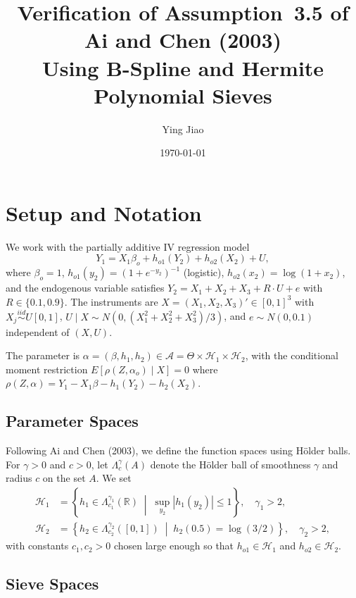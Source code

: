 \documentclass[12pt]{article}
\title{Verification of Assumption~3.5 of Ai and Chen (2003)\\[4pt]
\large Using B-Spline and Hermite Polynomial Sieves}
\author{Ying Jiao}
\date{\today}
\begin{document}
\maketitle

\section{Setup and Notation}

We work with the partially additive IV regression model
\begin{equation}\label{eq:structural}
Y_1 = X_1 \beta_o + h_{o1}(Y_2) + h_{o2}(X_2) + U,
\end{equation}
where $\beta_o = 1$, $h_{o1}(y_2) = (1+e^{-y_2})^{-1}$ (logistic), $h_{o2}(x_2) = \log(1+x_2)$, and the endogenous variable satisfies $Y_2 = X_1 + X_2 + X_3 + R \cdot U + e$ with $R \in \{0.1, 0.9\}$. The instruments are $X = (X_1, X_2, X_3)' \in [0,1]^3$ with $X_j \overset{iid}{\sim} U[0,1]$, $U \mid X \sim N(0, (X_1^2+X_2^2+X_3^2)/3)$, and $e \sim N(0, 0.1)$ independent of $(X, U)$.

The parameter is $\alpha = (\beta, h_1, h_2) \in \mathcal{A} = \Theta \times \mathcal{H}_1 \times \mathcal{H}_2$, with the conditional moment restriction $E[\rho(Z, \alpha_o) \mid X] = 0$ where $\rho(Z, \alpha) = Y_1 - X_1\beta - h_1(Y_2) - h_2(X_2)$.

\subsection{Parameter Spaces}

Following Ai and Chen (2003), we define the function spaces using H\"{o}lder balls. For $\gamma > 0$ and $c > 0$, let $\Lambda_c^{\gamma}(A)$ denote the H\"{o}lder ball of smoothness $\gamma$ and radius $c$ on the set $A$. We set
\begin{align}
\mathcal{H}_1 &= \left\{ h_1 \in \Lambda_{c_1}^{\gamma_1}(\mathbb{R}) \;\middle|\; \sup_{y_2} |h_1(y_2)| \leq 1 \right\}, \quad \gamma_1 > 2, \label{eq:H1}\\
\mathcal{H}_2 &= \left\{ h_2 \in \Lambda_{c_2}^{\gamma_2}([0,1]) \;\middle|\; h_2(0.5) = \log(3/2) \right\}, \quad \gamma_2 > 2, \label{eq:H2}
\end{align}
with constants $c_1, c_2 > 0$ chosen large enough so that $h_{o1} \in \mathcal{H}_1$ and $h_{o2} \in \mathcal{H}_2$.

\subsection{Sieve Spaces}
\end{document}
